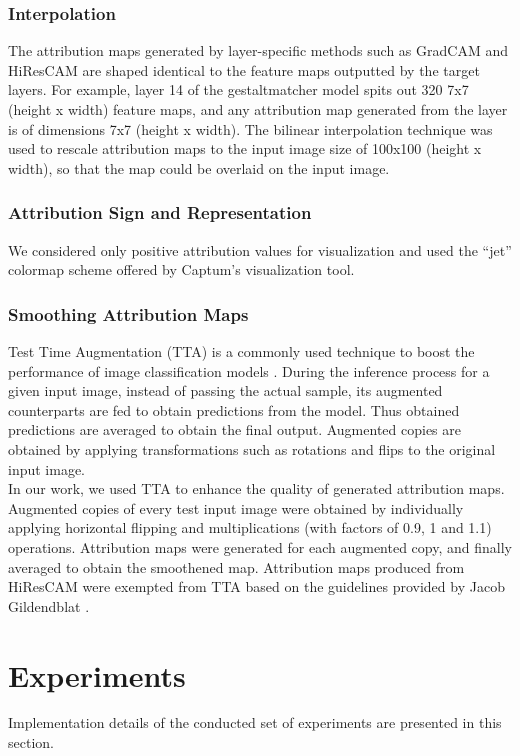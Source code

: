 \documentclass[../report.tex]{subfiles}
\begin{document}
	\subsubsection{Interpolation}
	The attribution maps generated by layer-specific methods such as GradCAM and HiResCAM are shaped identical to the feature maps outputted by the target layers. For example, layer 14 of the gestaltmatcher model spits out 320 7x7 (height x width) feature maps, and any attribution map generated from the layer is of dimensions 7x7 (height x width). The bilinear interpolation technique \cite{bovik2009essential} was used to rescale attribution maps to the input image size of 100x100 (height x width), so that the map could be overlaid on the input image.
	\subsubsection{Attribution Sign and Representation}
	We considered only positive attribution values for visualization and used the \enquote{jet} colormap scheme offered by Captum's \cite{kokhlikyan2020captum} visualization tool.
	\subsubsection{Smoothing Attribution Maps}
	Test Time Augmentation (TTA) is a commonly used technique to boost the performance of image classification models \cite{simonyan2014very}. During the inference process for a given input image, instead of passing the actual sample, its augmented counterparts are fed to obtain predictions from the model. Thus obtained predictions are averaged to obtain the final output. Augmented copies are obtained by applying transformations such as rotations and flips to the original input image.\\
	In our work, we used TTA to enhance the quality of generated attribution maps. Augmented copies of every test input image were obtained by individually applying horizontal flipping and multiplications (with factors of 0.9, 1 and 1.1) operations. Attribution maps were generated for each augmented copy, and finally averaged to obtain the smoothened map. Attribution maps produced from HiResCAM were exempted from TTA based on the guidelines provided by Jacob Gildendblat \cite{jacobgilpytorchcam}.
	
    \section{Experiments}
    Implementation details of the conducted set of experiments are presented in this section.
\end{document}
